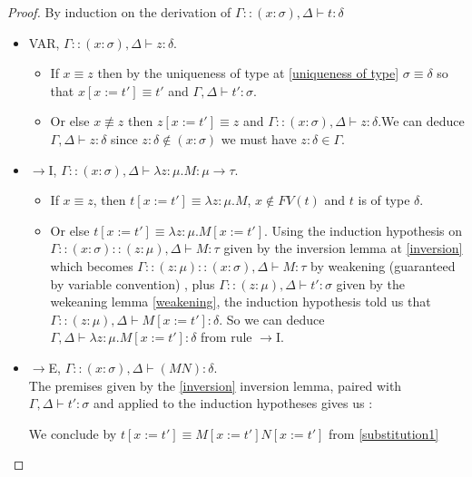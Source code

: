 \documentclass{article}
\begin{document}
    \begin{proof}
        By induction on the derivation of $\Gamma::(x:\sigma),\Delta\vdash t : \delta$
        \begin{itemize}
            \item VAR, $\Gamma::(x:\sigma),\Delta\vdash z : \delta$. 
            \begin{itemize}
                \item If $x\equiv z$ then by the uniqueness of type at \ref{uniqueness of type} $\sigma\equiv\delta$ so that $x[x:=t']\equiv t'$ and $\Gamma,\Delta\vdash t': \sigma$.
                \item Or else $x\not\equiv z$ then $z[x:=t']\equiv z$ and $\Gamma::(x:\sigma),\Delta\vdash z : \delta$.We can deduce $\Gamma,\Delta\vdash z : \delta$ since $z : \delta\not\in (x : \sigma)$ we must have $z :\delta \in \Gamma$.
            \end{itemize} 

            \item $\rightarrow$I, $\Gamma::(x:\sigma),\Delta\vdash\lambda z:\mu.M : \mu\rightarrow\tau$.
            \begin{itemize}
                \item If $x\equiv z$, then $t[x:=t']\equiv\lambda z:\mu.M$, $x\not\in FV(t)$ and $t$ is of type $\delta$.
                \item Or else $t[x:=t']\equiv\lambda z:\mu.M[x:=t']$. Using the induction hypothesis on $\Gamma::(x:\sigma)::(z : \mu),\Delta\vdash M :\tau$ given by the inversion lemma at \ref{inversion} which becomes $\Gamma::(z : \mu)::(x:\sigma),\Delta\vdash M :\tau$ by weakening (guaranteed by variable convention) , plus $\Gamma::(z : \mu),\Delta\vdash t':\sigma$ given by the wekeaning lemma \ref{weakening}, the induction hypothesis told us that $\Gamma::(z:\mu),\Delta\vdash M[x:=t'] : \delta$. So we can deduce $\Gamma,\Delta\vdash\lambda z : \mu.M[x:=t'] : \delta$ from rule $\rightarrow$I.
            \end{itemize} 

            \item $\rightarrow$E, $\Gamma::(x:\sigma),\Delta\vdash(M N) : \delta$.\\ The premises given by the \ref{inversion} inversion lemma, paired with $\Gamma,\Delta\vdash t' : \sigma$ and applied to the induction hypotheses gives us :
                
            \begin{prooftree}
            \end{prooftree}
            We conclude by $t[x:=t']\equiv M[x:=t'] N[x:=t']$ from \ref{substitution1}


\end{itemize}
\end{proof}
\end{document}
